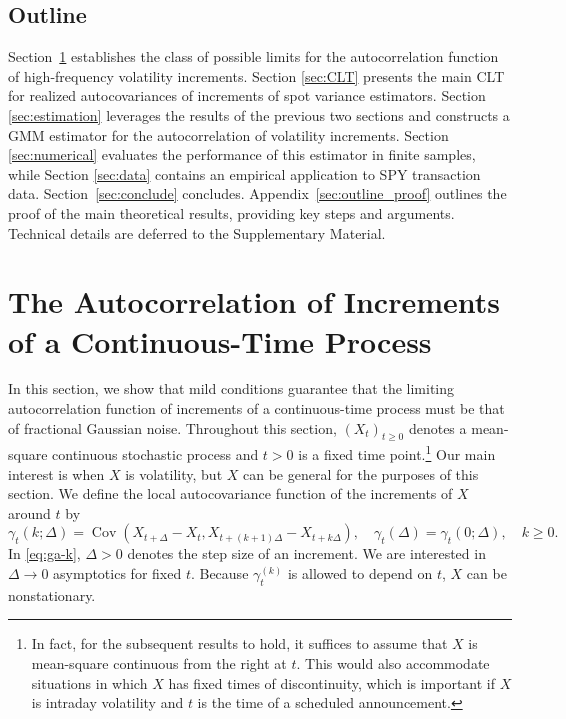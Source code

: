 \documentclass[ecta,nameyear,draft]{econsocart}
\newcommand{\1}{\mathbf 1}
\DeclareMathOperator{\Cov}{Cov}
\numberwithin{equation}{section}
\begin{document}
\subsection*{Outline}
Section~\ref{sec:acf} establishes the class of possible  limits for the   autocorrelation function of high-frequency volatility increments. Section  \ref{sec:CLT} presents the main CLT for realized autocovariances of increments of spot variance estimators.   Section \ref{sec:estimation} leverages the results of the previous two sections and constructs a GMM estimator for the autocorrelation of volatility increments. Section \ref{sec:numerical} evaluates the performance of this estimator in finite samples, while Section \ref{sec:data} contains an empirical application to SPY transaction data. Section~\ref{sec:conclude} concludes. Appendix~\ref{sec:outline_proof} outlines the proof of the main theoretical results, providing   key steps and arguments. Technical details   are deferred to the Supplementary Material. 

\section{The Autocorrelation of Increments of a Continuous-Time Process}\label{sec:acf}

In this section, we show that  mild conditions guarantee that the limiting autocorrelation function of increments of a continuous-time process must be that of fractional Gaussian noise. Throughout this section,  $(X_t)_{t\geq0}$ denotes a   mean-square continuous stochastic process and $t>0$ is a fixed time point.\footnote{In fact, for the subsequent results to hold, it suffices to assume that $X$ is mean-square continuous from the right at $t$. This would also accommodate situations in which $X$ has fixed times of discontinuity, which is important  if $X$ is intraday volatility and $t$ is the time of a  scheduled announcement.} Our main interest is when $X$ is volatility, but $X$ can be general for the purposes of this section. We define the local autocovariance function of the increments of $X$ around $t$  by
\begin{equation}\label{eq:ga-k} 
	\gamma_t(k;\Delta)= \Cov(X_{t+\Delta}-X_t,X_{t+(k+1)\Delta}-X_{t+k\Delta}),\quad \gamma_t(\Delta)=\gamma_t(0;\Delta),\quad  k\geq0.
\end{equation}
In \eqref{eq:ga-k}, $\Delta>0$ denotes the step size  of an increment. We are interested in $\Delta\to0$ asymptotics for fixed $t$. Because $\gamma_t^{(k)}$ is allowed to depend on $t$, $X$ can be nonstationary.
\end{document}
